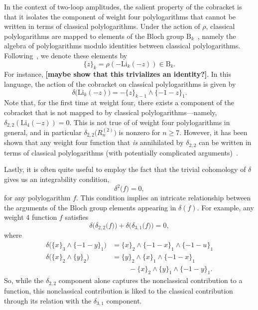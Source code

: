 \documentclass[11pt]{article}
\def\draftnote#1{{\bf [#1]}}
\begin{document}
In the context of two-loop amplitudes, the salient property of the cobracket is that it isolates the component of weight four polylogarithms that cannot be written in terms of classical polylogarithms. Under the action of $\rho$, classical polylogarithms are mapped to elements of the Bloch group $\text{B}_k$~\cite{Bloch:2000, Suslin:1990}, namely the algebra of polylogarithms modulo identities between classical polylogarithms. Following~\cite{Golden:2013xva}, we denote these elements by
\begin{equation}
 \{ z \}_k  = \rho(-\text{Li}_k(-z)) \in \text{B}_k.
\end{equation}
For instance, \draftnote{maybe show that this trivializes an identity?}. In this language, the action of the cobracket on classical polylogarithms is given by
\begin{equation}
\delta \big( \text{Li}_k(-z) \big) = - \{ z \}_{k-1} \wedge \{ -1-z \}_1 .
\end{equation}
Note that, for the first time at weight four, there exists a component of the cobracket that is not mapped to by classical polylogarithms---namely, $\delta_{2,2}(\text{Li}_4(-z))=0$. This is not true of of weight four polylogarithms in general, and in particular $\delta_{2,2} \big(R_n^{(2)} \big)$ is nonzero for $n\ge7$. However, it has been shown that any weight four function that \emph{is} annihilated by $\delta_{2,2}$ can be written in terms of classical polylogarithms (with potentially complicated arguments)~\cite{}. 

Lastly, it is often quite useful to employ the fact that the trivial cohomology of $\delta$ gives us an integrability condition,
\begin{equation}\label{eq:def-cobracket-integrability}
	\delta^2\big(f\big) = 0,
\end{equation}
for any polylogarithm $f$. This condition implies an intricate relationship between the arguments of the Bloch group elements appearing in $\delta(f)$. For example, any weight 4 function $f$ satisfies
\begin{equation}
	\delta\big(\delta_{2,2}\big(f\big)\big) + \delta\big(\delta_{3,1}\big(f\big)\big) = 0,
\end{equation}
where
\begin{align}
\delta\big( \{x\}_3 \wedge \{ -1-y \}_1 \big)&= \{ x\}_2 \wedge \{-1-x \}_1 \wedge \{ -1-u \}_1 \\
\delta\big( \{x\}_2 \wedge \{y\}_2 \big) &= \{ y\}_2 \wedge \{x\}_1 \wedge  \{-1-x\}_1 \\
&\hspace{1cm} - \{x\}_2 \wedge  \{y\}_1 \wedge  \{-1-y\}_1. \nonumber 
\end{align}
So, while the $\delta_{2,2}$ component alone captures the nonclassical contribution to a function, this nonclassical contribution is liked to the classical contribution through its relation with the $\delta_{3,1}$ component. 
\end{document}
